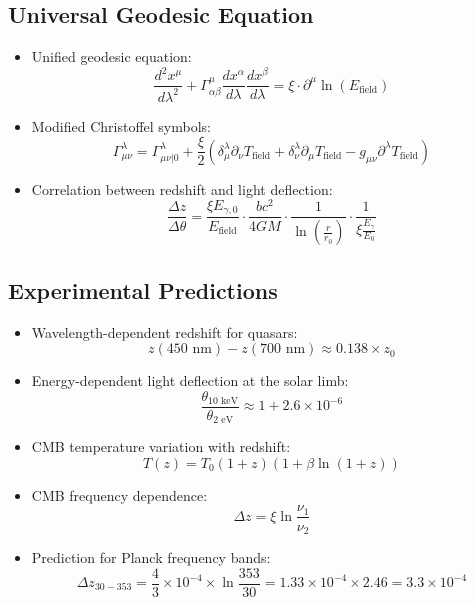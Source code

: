 \documentclass[12pt,a4paper]{article}
\begin{document}
	\subsection{Universal Geodesic Equation}
	\begin{itemize}
		\item Unified geodesic equation:
		$$\boxed{\frac{d^2 x^\mu}{d\lambda^2} + \Gamma^\mu_{\alpha\beta}\frac{dx^\alpha}{d\lambda}\frac{dx^\beta}{d\lambda} = \xi \cdot \partial^\mu \ln(E_{\text{field}})}$$
		
		\item Modified Christoffel symbols:
		$$\Gamma^\lambda_{\mu\nu} = \Gamma^\lambda_{\mu\nu|0} + \frac{\xi}{2} \left(\delta^\lambda_\mu \partial_\nu T_{\text{field}} + \delta^\lambda_\nu \partial_\mu T_{\text{field}} - g_{\mu\nu} \partial^\lambda T_{\text{field}}\right)$$
		
		\item Correlation between redshift and light deflection:
		$$\frac{\Delta z}{\Delta \theta} = \frac{\xi E_{\gamma,0}}{E_{\text{field}}} \cdot \frac{bc^2}{4GM} \cdot \frac{1}{\ln\left(\frac{r}{r_0}\right)} \cdot \frac{1}{\xi \frac{E_\gamma}{E_0}}$$
	\end{itemize}
	
	\subsection{Experimental Predictions}
	\begin{itemize}
		\item Wavelength-dependent redshift for quasars:
		$$z(450\text{ nm}) - z(700\text{ nm}) \approx 0.138 \times z_0$$
		
		\item Energy-dependent light deflection at the solar limb:
		$$\frac{\theta_{10\text{ keV}}}{\theta_{2\text{ eV}}} \approx 1 + 2.6 \times 10^{-6}$$
		
		\item CMB temperature variation with redshift:
		$$T(z) = T_0(1+z)\left(1 + \beta \ln(1+z)\right)$$
		
		\item CMB frequency dependence:
		$$\Delta z = \xi \ln\frac{\nu_1}{\nu_2}$$
		
		\item Prediction for Planck frequency bands:
		$$\Delta z_{30-353} = \frac{4}{3} \times 10^{-4} \times \ln\frac{353}{30} = 1.33 \times 10^{-4} \times 2.46 = 3.3 \times 10^{-4}$$
	\end{itemize}
	
\end{document}
